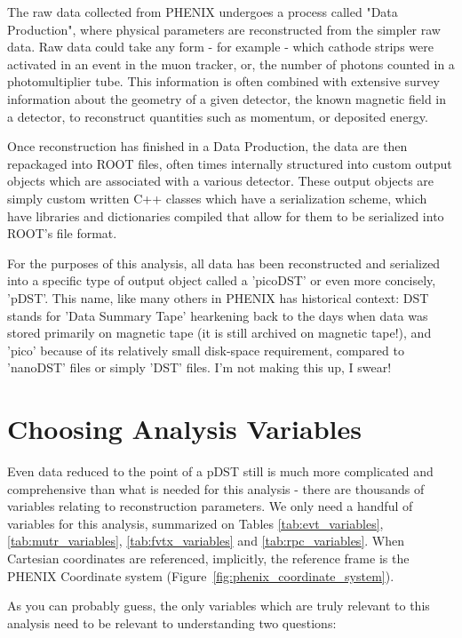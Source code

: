 The raw data collected from PHENIX undergoes a process called "Data Production",
where physical parameters are reconstructed from the simpler raw data. Raw data
could take any form - for example - which cathode strips were activated in an
event in the muon tracker, or, the number of photons counted in a
photomultiplier tube. This information is often combined with extensive survey
information about the geometry of a given detector, the known magnetic field in
a detector, to reconstruct quantities such as momentum, or deposited energy.

Once reconstruction has finished in a Data Production, the data are then
repackaged into ROOT files, often times internally structured into custom output
objects which are associated with a various detector. These output objects are
simply custom written C++ classes which have a serialization scheme, which have
libraries and dictionaries compiled that allow for them to be serialized into
ROOT's file format.

For the purposes of this analysis, all data has been reconstructed and
serialized into a specific type of output object called a 'picoDST' or even more
concisely, 'pDST'. This name, like many others in PHENIX has historical context:
DST stands for 'Data Summary Tape' hearkening back to the days when data was
stored primarily on magnetic tape (it is still archived on magnetic tape!), and
'pico' because of its relatively small disk-space requirement, compared to
'nanoDST' files or simply 'DST' files. I'm not making this up, I swear!

\section{Choosing Analysis Variables}

Even data reduced to the point of a pDST still is much more complicated and
comprehensive than what is needed for this analysis - there are thousands of
variables relating to reconstruction parameters. We only need a handful of
variables for this analysis, summarized on Tables
\ref{tab:evt_variables},\ref{tab:mutr_variables}, \ref{tab:fvtx_variables} and
\ref{tab:rpc_variables}. When Cartesian coordinates are referenced, implicitly,
the reference frame is the PHENIX Coordinate system
(Figure~\ref{fig:phenix_coordinate_system}).

As you can probably guess, the only variables which are truly relevant to this
analysis need to be relevant to understanding two questions:

